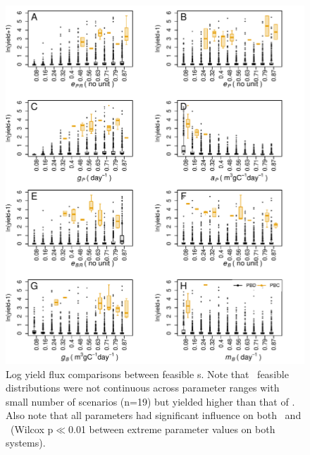 \documentclass[../thesis.tex]{subfiles} %
\begin{document}
\begin{figure}[H]
    \centering
    \includegraphics[width=\linewidth]{result/harvB.pdf}
    \caption[Log yield flux comparisons between feasible \pbs s]{Log yield flux comparisons between feasible \pbs s.  Note that \PBH\ feasible distributions were not continuous across parameter ranges with small number of scenarios (n=19) but yielded higher than that of \PBN.  Also note that all parameters had significant influence on both \PBN\ and \PBH\ (Wilcox p$\ll$0.01 between extreme parameter values on both systems).}
    \label{f:harvPB}
\end{figure}
\end{document}
